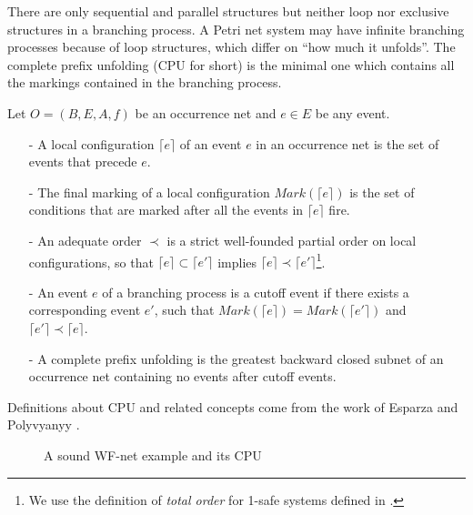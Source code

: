 \documentclass{llncs}
\begin{document}
There are only sequential and parallel structures but neither loop nor exclusive structures in a branching process. A Petri net system may have infinite branching processes because of loop structures, which differ on ``how much it unfolds''. The complete prefix unfolding (CPU for short) is the minimal one which contains all the markings contained in the branching process.

\begin{definition}\label{def:cpu}
Let $O=(B,E,A,f)$ be an occurrence net and $e\in E$ be any event.
	\begin{itemize}
		\item[-] A local configuration $\lceil e\rceil$ of an event $e$ in an occurrence net is the set of events that precede $e$.
		\item[-] The final marking of a local configuration $Mark(\lceil e\rceil)$ is the set of conditions that are marked after all the events in $\lceil e\rceil$ fire.
		\item[-] An adequate order $\prec$ is a strict well-founded partial order on local configurations, so that $\lceil e\rceil\subset\lceil e'\rceil$ implies $\lceil e\rceil\prec\lceil e'\rceil$\footnote{We use the definition of \emph{total order} for 1-safe systems defined in \cite{esparza2002improvement}.}.
		\item[-] An event $e$ of a branching process is a cutoff event if there exists a corresponding event $e'$, such that $Mark(\lceil e\rceil)=Mark(\lceil e'\rceil)$ and $\lceil e'\rceil\prec\lceil e\rceil$.
		\item[-] A complete prefix unfolding is the greatest backward closed subnet of an occurrence net containing no events after cutoff events.
	\end{itemize}
\end{definition}

Definitions about CPU and related concepts come from the work of Esparza \cite{esparza2002improvement} and Polyvyanyy \cite{polyvyanyy2010structuring}.

\begin{figure}[htbp]
\centering
{}
\caption{A sound WF-net example and its CPU\label{fig:examplePetriAndCpu}}
\end{figure}
\end{document}
